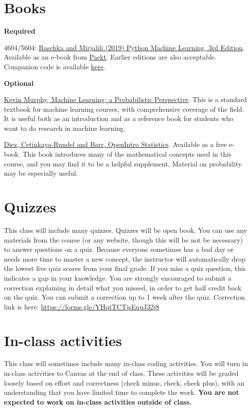 \documentclass[10pt]{memoir}
\begin{document}
\section{\textbf{Books}}

\textbf{Required}

4604/5604: \href{https://www.packtpub.com/product/python-machine-learning-third-edition/9781789955750}{Raschka and Mirjalili (2019) Python Machine Learning, 3rd Edition}. Available as an e-book from \href{https://www.packtpub.com/product/python-machine-learning-third-edition/9781789955750}{Packt}. Earlier editions are also acceptable. Companion code is available \href{https://github.com/rasbt/python-machine-learning-book-3rd-edition}{here}.
 
\textbf{Optional}

\href{https://www.cs.ubc.ca/~murphyk/MLbook/}{Kevin Murphy, Machine Learning: a Probabilistic Perspective}. This is a standard textbook for machine learning courses, with comprehensive coverage of the field. It is useful both as an introduction and as a reference book for students who want to do research in machine learning.

\href{https://www.abehandler.com/resources/openintro-statistics.pdf}{Diez, Cetinkaya-Rundel and Barr, OpenIntro Statistics}. Available as a free e-book. This book introduces many of the mathematical concepts used in this course, and you may find it to be a helpful supplement. Material on probability may be especially useful.

\section{\textbf{Quizzes}}

This class will include many quizzes.
Quizzes will be open book.
You can use any materials from the course (or any website, though this will be not be necessary) to answer questions on a quiz. 
Because everyone sometimes has a bad day or needs more time to master a new concept, the instructor will automatically drop the lowest five quiz scores from your final grade.
If you miss a quiz question, this indicates a gap in your knowledge. You are strongly encouraged to submit a correction explaining in detail what you missed, in order to get half credit back on the quiz. 
You can submit a correction up to 1 week after the quiz.
Correction link is here: \url{https://forms.gle/YHqtTCTjsEquJ32j8}

\section{\textbf{In-class activities}}
This class will sometimes include many in-class coding activities.
You will turn in in-class activities to Canvas at the end of class.
These activities will be graded loosely based on effort and correctness (check minus, check, check plus), with an understanding that you have limited time to complete the work.
\textbf{You are not expected to work on in-class activities outside of class.}
\end{document}
